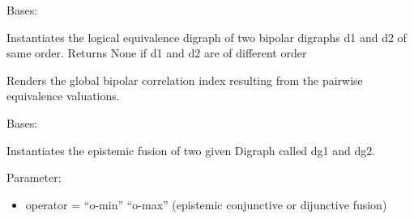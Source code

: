 \documentclass[letterpaper,10pt,english]{sphinxmanual}
\begin{document}

\begin{fulllineitems}
\label{techDoc:digraphs.EquivalenceDigraph}
Bases: {\hyperref[techDoc:digraphs.Digraph]{}}

Instantiates the logical equivalence digraph of two bipolar
digraphs d1 and d2 of same order. Returns None if d1 and d2 are of different order

\begin{fulllineitems}
\label{techDoc:digraphs.EquivalenceDigraph.computeCorrelation}
Renders the global bipolar correlation index resulting from the pairwise
equivalence valuations.

\end{fulllineitems}


\end{fulllineitems}


\begin{fulllineitems}
\label{techDoc:digraphs.FusionDigraph}
Bases: {\hyperref[techDoc:digraphs.Digraph]{}}

Instantiates the epistemic fusion of two given Digraph called dg1 and dg2.

Parameter:
\begin{itemize}
\item {} 
operator = ``o-min'' \textbar{} ``o-max'' (epistemic conjunctive or dijunctive fusion)

\end{itemize}

\end{fulllineitems}

\end{document}
